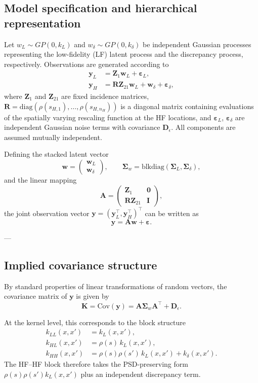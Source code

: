\documentclass[12pt]{article}
\begin{document}
\subsection{Model specification and hierarchical representation} 
Let $w_L \sim GP(0,k_L)$ and $w_\delta \sim GP(0,k_\delta)$ be independent
Gaussian processes representing the low-fidelity (LF) latent process and
the discrepancy process, respectively. Observations are generated according
to
\begin{align}
\bm{y}_L &= \bm{Z}_1 \bm{w}_L + \bm{\varepsilon}_L, \\
\bm{y}_H &= \bm{R}\bm{Z}_{21}\bm{w}_L + \bm{w}_\delta + \bm{\varepsilon}_\delta,
\end{align}
where $\bm{Z}_1$ and $\bm{Z}_{21}$ are fixed incidence matrices,
$\bm{R}=\mathrm{diag}(\rho(s_{H,1}),\ldots,\rho(s_{H,n_H}))$ is a diagonal
matrix containing evaluations of the spatially varying rescaling function at
the HF locations, and $\bm{\varepsilon}_L$, $\bm{\varepsilon}_\delta$ are
independent Gaussian noise terms with covariance $\bm{D}_\epsilon$.
All components are assumed mutually independent.

Defining the stacked latent vector
\[
\bm{w} =
\begin{pmatrix}
\bm{w}_L \\
\bm{w}_\delta
\end{pmatrix},
\qquad
\boldsymbol{\Sigma}_w =
\mathrm{blkdiag}(\boldsymbol{\Sigma}_L,\boldsymbol{\Sigma}_\delta),
\]
and the linear mapping
\[
\bm{A} =
\begin{pmatrix}
\bm{Z}_1 & \bm{0} \\
\bm{R}\bm{Z}_{21} & \bm{I}
\end{pmatrix},
\]
the joint observation vector $\bm{y}=(\bm{y}_L^\top,\bm{y}_H^\top)^\top$
can be written as
\[
\bm{y} = \bm{A}\bm{w} + \bm{\varepsilon}.
\]

---

\subsection{Implied covariance structure}
By standard properties of linear transformations of random vectors, the
covariance matrix of $\bm{y}$ is given by
\begin{equation}
\label{eq:K_factorization}
\bm{K}
=
\mathrm{Cov}(\bm{y})
=
\bm{A}\boldsymbol{\Sigma}_w\bm{A}^\top
+
\bm{D}_\epsilon.
\end{equation}

At the kernel level, this corresponds to the block structure
\begin{align}
k_{LL}(x,x') &= k_L(x,x'), \\
k_{HL}(x,x') &= \rho(s)\,k_L(x,x'), \\
k_{HH}(x,x') &= \rho(s)\rho(s')\,k_L(x,x') + k_\delta(x,x').
\end{align}
The HF--HF block therefore takes the PSD-preserving form
$\rho(s)\rho(s')k_L(x,x')$ plus an independent discrepancy term.
\end{document}
